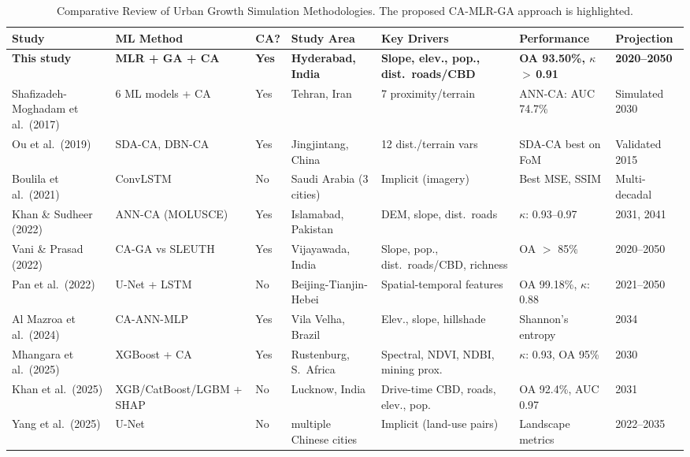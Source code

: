 \documentclass[12pt,a4paper]{article}
\begin{document}
\begin{table}[H]
\caption{Comparative Review of Urban Growth Simulation Methodologies. The proposed CA-MLR-GA approach is highlighted.}
\label{tab:litreview}
\centering
\scriptsize
\renewcommand{\arraystretch}{1.25}
\begin{tabular}{p{2.6cm}p{2.4cm}p{1.0cm}p{2.2cm}p{2.2cm}p{2.2cm}p{2.0cm}}
\toprule
\textbf{Study} & \textbf{ML Method} & \textbf{CA?} & \textbf{Study Area} & \textbf{Key Drivers} & \textbf{Performance} & \textbf{Projection} \\
\midrule
\textbf{This study} & \textbf{MLR + GA + CA} & \textbf{Yes} & \textbf{Hyderabad, India} & \textbf{Slope, elev., pop., dist.\ roads/CBD} & \textbf{OA 93.50\%, $\kappa$\,$>$\,0.91} & \textbf{2020--2050} \\
\midrule
Shafizadeh-Moghadam et al.\ (2017) \cite{shafizadeh2017} & 6 ML models + CA & Yes & Tehran, Iran & 7 proximity/terrain & ANN-CA: AUC 74.7\% & Simulated 2030 \\
Ou et al.\ (2019) \cite{ou2019} & SDA-CA, DBN-CA & Yes & Jingjintang, China & 12 dist./terrain vars & SDA-CA best on FoM & Validated 2015 \\
Boulila et al.\ (2021) \cite{boulila2021} & ConvLSTM & No & Saudi Arabia (3 cities) & Implicit (imagery) & Best MSE, SSIM & Multi-decadal \\
Khan \& Sudheer (2022) \cite{khan2022} & ANN-CA (MOLUSCE) & Yes & Islamabad, Pakistan & DEM, slope, dist.\ roads & $\kappa$: 0.93--0.97 & 2031, 2041 \\
Vani \& Prasad (2022) \cite{vani2022} & CA-GA vs SLEUTH & Yes & Vijayawada, India & Slope, pop., dist.\ roads/CBD, richness & OA $>$ 85\% & 2020--2050 \\
Pan et al.\ (2022) \cite{pan2022} & U-Net + LSTM & No & Beijing-Tianjin-Hebei & Spatial-temporal features & OA 99.18\%, $\kappa$: 0.88 & 2021--2050 \\
Al Mazroa et al.\ (2024) \cite{almazroa2024} & CA-ANN-MLP & Yes & Vila Velha, Brazil & Elev., slope, hillshade & Shannon's entropy & 2034 \\
Mhangara et al.\ (2025) \cite{mhangara2025} & XGBoost + CA & Yes & Rustenburg, S.\ Africa & Spectral, NDVI, NDBI, mining prox. & $\kappa$: 0.93, OA 95\% & 2030 \\
Khan et al.\ (2025) \cite{khan2025} & XGB/CatBoost/LGBM + SHAP & No & Lucknow, India & Drive-time CBD, roads, elev., pop. & OA 92.4\%, AUC 0.97 & 2031 \\
Yang et al.\ (2025) \cite{yang2025} & U-Net & No & multiple Chinese cities & Implicit (land-use pairs) & Landscape metrics & 2022--2035 \\
\bottomrule
\end{tabular}
\end{table}
\end{document}
